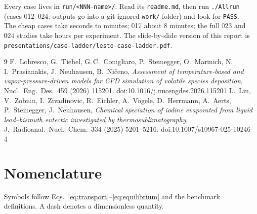 \documentclass[10pt,a4paper]{article}
\begin{document}
\begin{inshort}
Every case lives in \texttt{run/<NNN-name>/}. Read its \texttt{readme.md},
then run \texttt{./Allrun} (cases 012--024; outputs go into a
git-ignored \texttt{work/} folder) and look for \texttt{PASS}. The cheap
cases take seconds to minutes; 017 about 8 minutes; the full 023 and 024
studies take hours per experiment. The slide-by-slide version of this
report is \texttt{presentations/case-ladder/lesto-case-ladder.pdf}.
\end{inshort}

\vspace{-0.4em}
{\small
\renewcommand{\refname}{\normalsize References}
\begin{thebibliography}{9}\setlength{\itemsep}{1pt}
 F.~Lobresco, G.~Tiebel, G.\,C.~Conigliaro, P.~Steinegger,
  O.~Marinich, N.\,I.~Prasianakis, J.~Neuhausen, B.~Ničeno,
  \emph{Assessment of temperature-based and vapor-pressure-driven models for
  CFD simulation of volatile species deposition},
  Nucl.\ Eng.\ Des.\ 459 (2026) 115201. doi:10.1016/j.nucengdes.2026.115201
 L.~Liu, V.~Zobnin, I.~Zivadinovic, R.~Eichler, A.~Vögele,
  D.~Herrmann, A.~Aerts, P.~Steinegger, J.~Neuhausen,
  \emph{Chemical speciation of iodine evaporated from liquid lead--bismuth
  eutectic investigated by thermosublimatography},
  J.\ Radioanal.\ Nucl.\ Chem.\ 334 (2025) 5201--5216. doi:10.1007/s10967-025-10246-4
\end{thebibliography}}

\clearpage
\section*{Nomenclature}
\label{sec:nomenclature}
Symbols follow Eqs.~\eqref{eq:transport}--\eqref{eq:equilibrium} and the
benchmark definitions. A dash denotes a dimensionless quantity.
\end{document}
